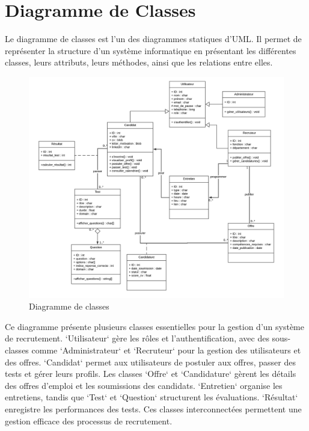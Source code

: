 \section{Diagramme de Classes}
Le diagramme de classes est l'un des diagrammes statiques d'UML. 
Il permet de représenter la structure d'un système informatique en 
présentant les différentes classes, leurs attributs, leurs méthodes, 
ainsi que les relations entre elles.
\\

\begin{figure}[htbp]
   \centering
   \includegraphics[scale=0.7]{diag/class2.png} %
   \caption{Diagramme de classes}
   \label{fig:ClassDiag}
\end{figure}

Ce diagramme présente plusieurs classes essentielles pour la gestion d'un système de recrutement. `Utilisateur` gère les rôles et 
l'authentification, avec des sous-classes comme `Administrateur` et `Recruteur` pour la gestion des utilisateurs et des offres. `Candidat` 
permet aux utilisateurs de postuler aux offres, passer des tests et gérer leurs profils. Les classes `Offre` et `Candidature` gèrent les détails 
des offres d'emploi et les soumissions des candidats. `Entretien` organise les entretiens, tandis que `Test` et `Question` structurent 
les évaluations. `Résultat` enregistre les performances des tests. Ces classes interconnectées permettent une gestion efficace des processus 
de recrutement.
\vspace{6cm}

